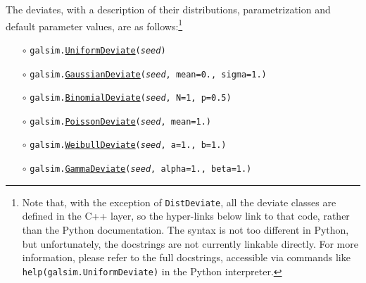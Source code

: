 \documentclass[preprint,10pt]{../../devel/modules/aastex}
\begin{document}
The deviates, with a description of their distributions, parametrization and
default parameter values, are as follows:\footnote{
Note that, with the exception of \texttt{DistDeviate},
all the deviate classes are defined in the C++ layer, so the hyper-links
below link to that code, rather than the Python documentation.  The
syntax is not too different in Python, but unfortunately, the docstrings
are not currently linkable directly.  
For more information, please refer to the full docstrings, accessible
via commands like \texttt{help(galsim.UniformDeviate)} in the Python interpreter.}
\begin{itemize}

\item[$\circ$] \texttt{galsim.\href{http://galsim-developers.github.io/GalSim/classgalsim_1_1_uniform_deviate.html}{UniformDeviate}(\emph{seed})} \newline {uniform distribution in the
  interval $[0, 1)$.}

\item[$\circ$] \texttt{galsim.\href{http://galsim-developers.github.io/GalSim/classgalsim_1_1_gaussian_deviate.html}{GaussianDeviate}(\emph{seed}, mean=0., sigma=1.)} 

\item[$\circ$] \texttt{galsim.\href{http://galsim-developers.github.io/GalSim/classgalsim_1_1_binomial_deviate.html}{BinomialDeviate}(\emph{seed}, N=1, p=0.5)} 

\item[$\circ$] \texttt{galsim.\href{http://galsim-developers.github.io/GalSim/classgalsim_1_1_poisson_deviate.html}{PoissonDeviate}(\emph{seed}, mean=1.)} 

\item[$\circ$] \texttt{galsim.\href{http://galsim-developers.github.io/GalSim/classgalsim_1_1_weibull_deviate.html}{WeibullDeviate}(\emph{seed}, a=1., b=1.)} 

\item[$\circ$] \texttt{galsim.\href{http://galsim-developers.github.io/GalSim/classgalsim_1_1_gamma_deviate.html}{GammaDeviate}(\emph{seed}, alpha=1., beta=1.)} 


\end{itemize}
\end{document}
